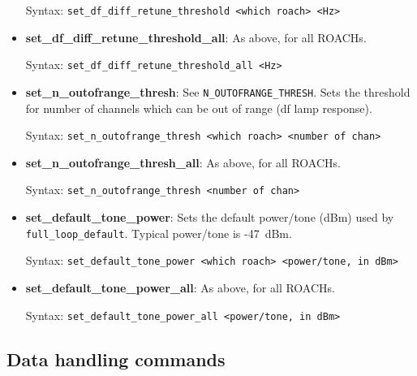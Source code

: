 \begin{itemize}[leftmargin=*,label={}]
Syntax: \texttt{set\_df\_diff\_retune\_threshold <which roach> <Hz>}

\item \textbf{set\_df\_diff\_retune\_threshold\_all}: As above, for all ROACHs.

Syntax: \texttt{set\_df\_diff\_retune\_threshold\_all <Hz>}

\item \textbf{set\_n\_outofrange\_thresh}: See \texttt{N\_OUTOFRANGE\_THRESH}. Sets the threshold for number of channels which can be out of range (df lamp response).

Syntax: \texttt{set\_n\_outofrange\_thresh <which roach> <number of chan>}

\item \textbf{set\_n\_outofrange\_thresh\_all}: As above, for all ROACHs.

Syntax: \texttt{set\_n\_outofrange\_thresh <number of chan>}

\item \textbf{set\_default\_tone\_power}: Sets the default power/tone (dBm) used by \texttt{full\_loop\_default}. Typical power/tone is -47~dBm.

Syntax: \texttt{set\_default\_tone\_power <which roach> <power/tone, in dBm>}

\item \textbf{set\_default\_tone\_power\_all}: As above, for all ROACHs.

Syntax: \texttt{set\_default\_tone\_power\_all <power/tone, in dBm>}

\end{itemize}

\subsection{Data handling commands}


